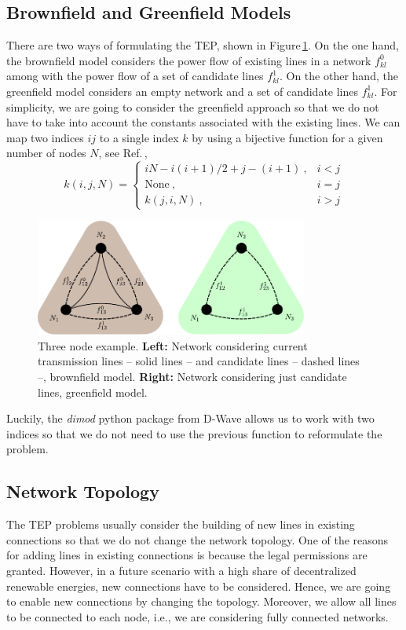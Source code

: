 \subsection{Brownfield and Greenfield Models}
There are two ways of formulating the TEP, shown in Figure\,\ref{fig: ThreeNode}. On the one hand, the brownfield model considers the power flow of existing lines in a network $f_{kl}^{0}$ among with the power flow of a set of candidate lines $f_{kl}^{1}$. On the other hand, the greenfield model considers an empty network and a set of candidate lines $f_{kl}^{1}$. For simplicity, we are going to consider the greenfield approach so that we do not have to take into account the constants associated with the existing lines. We can map two indices $ij$ to a single index $k$ by using a bijective function for a given number of nodes $N$, see Ref.\,\cite{Jain2021SolvingComputer},
\begin{equation}
k(i,j,N) = \begin{cases}
    iN - i\left(i+1\right)/2 + j - (i+1)\ , & i<j\\
    \text{None}\ ,& i=j \\
    k(j,i,N)\ , & i>j
\end{cases}
    \label{eq: TwoIndexesmap}
\end{equation}
\begin{figure}[H]
  \begin{center}
\includegraphics[width=0.8\textwidth]{Figures/3NodeBrownGreen.pdf}
  \end{center}
  \caption{Three node example. \textbf{Left:} Network considering current transmission lines -- solid lines -- and candidate lines -- dashed lines --, brownfield model. \textbf{Right:} Network considering just candidate lines, greenfield model.}
  \label{fig: ThreeNode}
\end{figure}
Luckily, the \textit{dimod} python package from D-Wave allows us to work with two indices so that we do not need to use the previous function to reformulate the problem. 
\subsection{Network Topology}
The TEP problems usually consider the building of new lines in existing connections so that we do not change the network topology. One of the reasons for adding lines in existing connections is because the legal permissions are granted. However, in a future scenario with a high share of decentralized renewable energies, new connections have to be considered. Hence, we are going to enable new connections by changing the topology. Moreover, we allow all lines to be connected to each node, i.e., we are considering fully connected networks.
